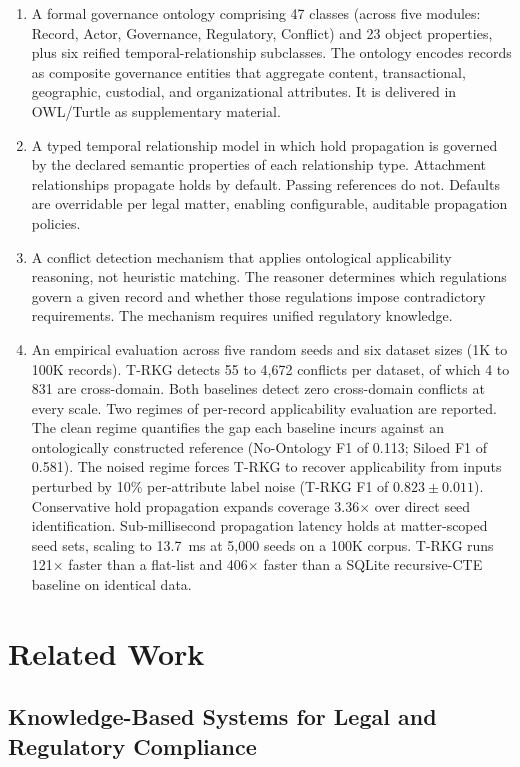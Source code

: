 \documentclass{ieeeaccess}
\begin{document}
\begin{enumerate}
    \item A formal governance ontology comprising 47 classes (across five modules: Record, Actor, Governance, Regulatory, Conflict) and 23 object properties, plus six reified temporal-relationship subclasses. The ontology encodes records as composite governance entities that aggregate content, transactional, geographic, custodial, and organizational attributes. It is delivered in OWL/Turtle as supplementary material.
    \item A typed temporal relationship model in which hold propagation is governed by the declared semantic properties of each relationship type. Attachment relationships propagate holds by default. Passing references do not. Defaults are overridable per legal matter, enabling configurable, auditable propagation policies.
    \item A conflict detection mechanism that applies ontological applicability reasoning, not heuristic matching. The reasoner determines which regulations govern a given record and whether those regulations impose contradictory requirements. The mechanism requires unified regulatory knowledge.
    \item An empirical evaluation across five random seeds and six dataset sizes (1K to 100K records). T-RKG detects 55 to 4{,}672 conflicts per dataset, of which 4 to 831 are cross-domain. Both baselines detect zero cross-domain conflicts at every scale. Two regimes of per-record applicability evaluation are reported. The clean regime quantifies the gap each baseline incurs against an ontologically constructed reference (No-Ontology F1 of 0.113; Siloed F1 of 0.581). The noised regime forces T-RKG to recover applicability from inputs perturbed by 10\% per-attribute label noise (T-RKG F1 of $0.823 \pm 0.011$). Conservative hold propagation expands coverage 3.36$\times$ over direct seed identification. Sub-millisecond propagation latency holds at matter-scoped seed sets, scaling to 13.7~ms at 5{,}000 seeds on a 100K corpus. T-RKG runs 121$\times$ faster than a flat-list and 406$\times$ faster than a SQLite recursive-CTE baseline on identical data.
\end{enumerate}

\section{Related Work}

\subsection{Knowledge-Based Systems for Legal and Regulatory Compliance}
\end{document}
